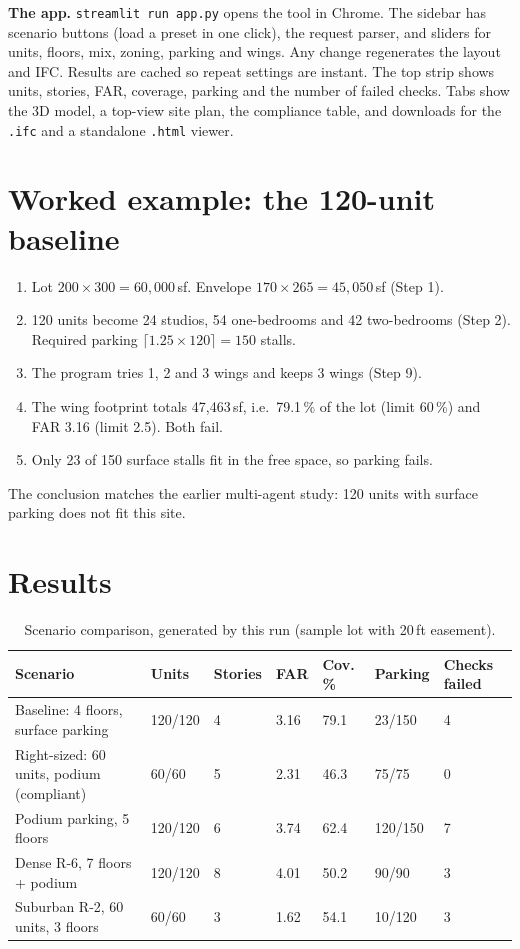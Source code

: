 \documentclass[11pt]{article}
\begin{document}
\textbf{The app.} \texttt{streamlit run app.py} opens the tool in Chrome. The sidebar has scenario buttons (load a preset in one click), the request parser, and sliders for units, floors, mix, zoning, parking and wings. Any change regenerates the layout and IFC. Results are cached so repeat settings are instant. The
top strip shows units, stories, FAR, coverage, parking and the number of failed checks. Tabs show the 3D model, a top-view site plan, the compliance table, and downloads for the \texttt{.ifc} and a standalone \texttt{.html} viewer.

\section{Worked example: the 120-unit baseline}
\begin{enumerate}[nosep]
\item Lot $200\times300 = 60,000$\,sf. Envelope $170\times265 = 45,050$\,sf (Step 1).
\item 120 units become 24 studios, 54 one-bedrooms and 42 two-bedrooms (Step 2). Required parking $\lceil 1.25\times120\rceil = 150$ stalls.
\item The program tries 1, 2 and 3 wings and keeps 3 wings (Step 9).
\item The wing footprint totals 47,463\,sf, i.e.\ 79.1\,\% of the lot (limit 60\,\%) and FAR 3.16 (limit 2.5). Both fail.
\item Only 23 of 150 surface stalls fit in the free space, so parking fails.
\end{enumerate}
The conclusion matches the earlier multi-agent study: 120 units with surface parking does not fit this site.

\section{Results}
\begin{table}[H]\centering\footnotesize
\caption{Scenario comparison, generated by this run (sample lot with 20\,ft easement).}
\begin{tabular}{lllllll}\toprule
Scenario & Units & Stories & FAR & Cov.\,\% & Parking & Checks failed \\ \midrule
Baseline: 4 floors, surface parking & 120/120 & 4 & 3.16 & 79.1 & 23/150 & 4 \\
Right-sized: 60 units, podium (compliant) & 60/60 & 5 & 2.31 & 46.3 & 75/75 & 0 \\
Podium parking, 5 floors & 120/120 & 6 & 3.74 & 62.4 & 120/150 & 7 \\
Dense R-6, 7 floors + podium & 120/120 & 8 & 4.01 & 50.2 & 90/90 & 3 \\
Suburban R-2, 60 units, 3 floors & 60/60 & 3 & 1.62 & 54.1 & 10/120 & 3 \\
\bottomrule\end{tabular}\end{table}
\end{document}
